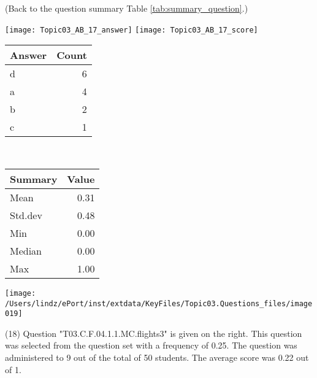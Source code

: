 \documentclass[12pt,english,nohyper]{tufte-handout}\usepackage[]{graphicx}\usepackage[]{color}
\begin{document}
 (Back to the question summary Table \ref{tab:summary_question}.)

\begin{center} \texttt{[image: Topic03\_AB\_17\_answer]} \texttt{[image: Topic03\_AB\_17\_score]} \end{center} 

\begin{center}%
\begin{tabular}{lr}
  \hline
Answer & Count \\ 
  \hline
d &   6 \\ 
  a &   4 \\ 
  b &   2 \\ 
  c &   1 \\ 
   \hline
\end{tabular}
~~~~~~~~%
\begin{tabular}{lr}
  \hline
Summary & Value \\ 
  \hline
Mean & 0.31 \\ 
  Std.dev & 0.48 \\ 
  Min & 0.00 \\ 
  Median & 0.00 \\ 
  Max & 1.00 \\ 
   \hline
\end{tabular}
\end{center}\newpage{}



\vspace{4cm}\begin{marginfigure}\texttt{[image: /Users/lindz/ePort/inst/extdata/KeyFiles/Topic03.Questions\_files/image019]}\end{marginfigure}\vspace{-4cm} (18) Question "T03.C.F.04.1.1.MC.flights3" is given on the right. This question was selected from the question set with a frequency of 0.25. The question was administered to 9 out of the total of 50 students. The average score was 0.22 out of 1.
\end{document}
